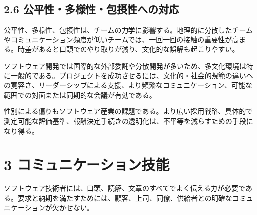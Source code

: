 \documentclass[uplatex,dvipdfmx,a4paper,11pt]{jsarticle}
\begin{document}
\begin{center}
\end{center}

\subsection*{2.6 公平性・多様性・包摂性への対応}


公平性、多様性、包摂性は、チームの力学に影響する。地理的に分散したチームやコミュニケーション頻度が低いチームでは、一回一回の接触の重要性が高まる。時差があると口頭でのやり取りが減り、文化的な誤解も起こりやすい。

ソフトウェア開発では国際的な外部委託や分散開発が多いため、多文化環境は特に一般的である。プロジェクトを成功させるには、文化的・社会的規範の違いへの寛容さ、リーダーシップによる支援、より頻繁なコミュニケーション、可能な範囲での対面または同期的な会議が有効である。

性別による偏りもソフトウェア産業の課題である。より広い採用戦略、具体的で測定可能な評価基準、報酬決定手続きの透明化は、不平等を減らすための手段になり得る。

\begin{center}
\end{center}

\section*{3 コミュニケーション技能}


ソフトウェア技術者には、口頭、読解、文章のすべてでよく伝える力が必要である。要求と納期を満たすためには、顧客、上司、同僚、供給者との明確なコミュニケーションが欠かせない。
\end{document}
